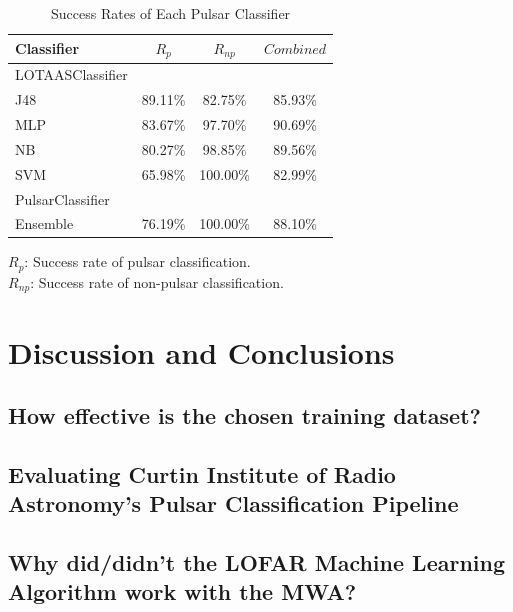 \documentclass{article}
\begin{document}
\begin{table}[H]
    \centering
    
    \caption{Success Rates of Each Pulsar Classifier}

    \begin{framed}
        \begin{tabular}{l c c c}
            Classifier & $R_p$ & $R_{np}$ & $Combined$ \\
            \hline
            \hline
            LOTAASClassifier &  &  & \\
            \hline
            J48 & 89.11\% & 82.75\% & 85.93\% \\
            MLP & 83.67\% & 97.70\% & 90.69\% \\
            NB & 80.27\% & 98.85\% & 89.56\%\\
            SVM & 65.98\% & 100.00\% & 82.99\% \\
            \hline
            PulsarClassifier &  &  & \\
            \hline
            Ensemble & 76.19\% & 100.00\% & 88.10\% \\
        \end{tabular}

        \vspace{5px}
        $R_p$: Success rate of pulsar classification.\\
        $R_{np}$: Success rate of non-pulsar classification. \\
    \end{framed}
    \label{tab:analyses}
\end{table}

\pagebreak
\section{Discussion and Conclusions}
\subsection{How effective is the chosen training dataset?}
\subsection{Evaluating Curtin Institute of Radio Astronomy's Pulsar Classification Pipeline}
\subsection{Why did/didn't the LOFAR Machine Learning Algorithm work with the MWA?}
\end{document}
